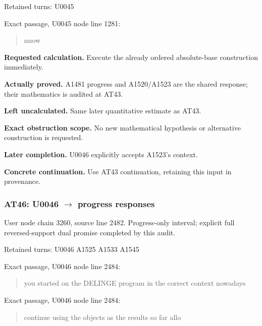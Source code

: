 Retained turns: U0045
\protect{}

Exact passage, U0045 node
\protect{} line 1281:

\begin{quote}
nnow
\end{quote}

\textbf{Requested calculation.} Execute the already ordered
absolute-base construction immediately.

\textbf{Actually proved.} A1481 progress and A1520/A1523 are the shared
response; their mathematics is audited at AT43.

\textbf{Left uncalculated.} Same later quantitative estimate as AT43.

\textbf{Exact obstruction scope.} No new mathematical hypothesis or
alternative construction is requested.

\textbf{Later completion.} U0046 explicitly accepts A1523's context.

\textbf{Concrete continuation.} Use AT43 continuation, retaining this
input in provenance.

\subsubsection{\texorpdfstring{AT46: U0046
\allowbreak{}\ensuremath{→}\allowbreak{} progress
responses}{AT46: U0046  progress responses}}\label{at46-u0046-progress-responses}

User node \protect{} chain
3260, source line 2482. Progress-only interval; explicit full
reversed-support dual promise completed by this audit.

Retained turns: U0046
\protect{} A1525
\protect{} A1533
\protect{} A1545
\protect{}

Exact passage, U0046 node
\protect{} line 2484:

\begin{quote}
you started on the DELINGE program in the correct context nowadays
\end{quote}

Exact passage, U0046 node
\protect{} line 2484:

\begin{quote}
continue using the objects as the results so far allo
\end{quote}

